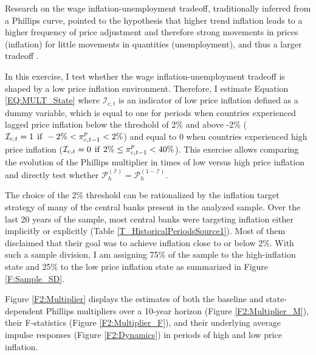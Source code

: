 \documentclass[12pt]{article}
\begin{document}
Research on the wage inflation-unemployment tradeoff, traditionally inferred from a Phillips curve, pointed to the hypothesis that higher trend inflation leads to a higher frequency of price adjustment and therefore strong movements in prices (inflation) for little movements in quantities (unemployment), and thus a larger tradeoff \citep{Benati2007}.

In this exercise, I test whether the wage inflation-unemployment tradeoff is shaped by a low price inflation environment. Therefore, I estimate Equation \eqref{EQ:MULT_State} where $\mathcal{I}_{c,t}$ is an indicator of low price inflation defined as a dummy variable, which is equal to one for periods when countries experienced lagged price inflation below the threshold of 2\% and above -2\% ($\mathcal{I}_{c,t} = 1 \hspace{1ex} \text{if} \hspace{1ex} -2\% < \pi^p_{c,t-1} < 2\%$) and equal to 0 when countries experienced high price inflation ($\mathcal{I}_{c,t} = 0 \hspace{1ex} \text{if} \hspace{1ex} 2\% \leq \pi^p_{c,t-1} < 40\%$). This exercise allows comparing the evolution of the Phillips multiplier in times of low versus high price inflation and directly test whether $\mathcal{P}_h^{(\mathcal{I})} = \mathcal{P}_h^{(1-\mathcal{I})}$.

The choice of the 2\% threshold can be rationalized by the inflation target strategy of many of the central banks present in the analyzed sample. Over the last 20 years of the sample, most central banks were targeting inflation either implicitly or explicitly (Table \ref{T_HistoricalPeriodsSource1}). Most of them disclaimed that their goal was to achieve inflation close to or below 2\%. With such a sample division, I am assigning 75\% of the sample to the high-inflation state and 25\% to the low price inflation state as summarized in Figure \ref{F:Sample_SD}.

Figure \ref{F2:Multiplier} displays the estimates of both the baseline and state-dependent Phillips multipliers over a 10-year horizon (Figure \ref{F2:Multiplier_M}), their F-statistics (Figure \ref{F2:Multiplier_F}), and their underlying average impulse responses (Figure \ref{F2:Dynamics}) in periods of high and low price inflation.
\end{document}
